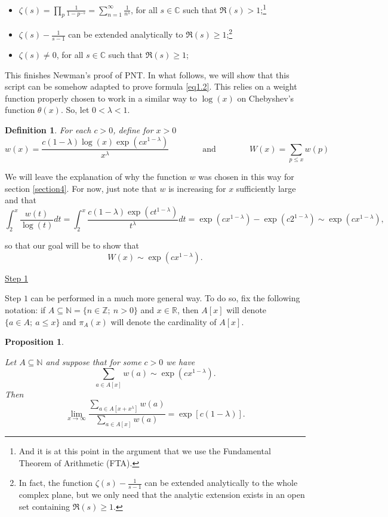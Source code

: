 \documentclass[11pt]{amsart}
\newtheorem{proposition}[theorem]{Proposition}
\newtheorem{defi}[theorem]{Definition}
\numberwithin{equation}{section}
\newcommand{\N}{\mathbb{N}}
\newcommand{\Z}{\mathbb{Z}}
\newcommand{\R}{\mathbb{R}}
\newcommand{\C}{\mathbb{C}}
\newcommand{\disum}{\displaystyle \sum}
\newcommand{\diint}{\displaystyle \int}
\newcommand{\dilim}{\displaystyle \lim}
\newcommand{\diprod}{\displaystyle \prod}
\newcommand{\difrac}{\displaystyle \frac}
\begin{document}
\begin{itemize}
    \item $\zeta(s) = \diprod_p \difrac{1}{1 - p^{-s}} = \sum_{n = 1}^{\infty} \difrac{1}{n^s}$, for all $s \in \C$ such that $\Re(s) > 1$;\footnote{And it is at this point in the argument that we use the Fundamental Theorem of Arithmetic (FTA).}
    \item $\zeta(s) - \difrac{1}{s - 1}$ can be extended analytically to $\Re(s) \geq 1$;\footnote{In fact, the function $\zeta(s) - \difrac{1}{s - 1}$ can be extended analytically to the whole complex plane, but we only need that the analytic extension exists in an open set containing $\Re(s) \geq 1$.}
    \item $\zeta(s) \neq 0$, for all $s \in \C$ such that $\Re(s) \geq 1$;
\end{itemize}

This finishes Newman's proof of PNT. In what follows, we will show that this script can be somehow adapted to prove formula \ref{eq1.2}. This relies on a weight function properly chosen to work in a similar way to $\log(x)$ on Chebyshev's function $\theta(x)$. So, let $0 < \lambda < 1$.

\begin{defi}
For each $c > 0$, define for $x > 0$ $$w(x) = \difrac{c(1 - \lambda)\log(x)\exp(cx^{1 - \lambda})}{x^{\lambda}} \qquad \qquad \text{and} \qquad \qquad W(x) = \disum_{p \leq x} w(p)$$ 
\end{defi}

We will leave the explanation of why the function $w$ was chosen in this way for section \ref{section4}. For now, just note that $w$ is increasing for $x$ sufficiently large and that $$\diint_{2}^{x} \difrac{w(t)}{\log(t)} dt = \diint_{2}^{x} \difrac{c(1 - \lambda)\exp(ct^{1 - \lambda})}{t^{\lambda}} dt = \exp(cx^{1 - \lambda}) - \exp(c2^{1 - \lambda}) \sim \exp(cx^{1 - \lambda}),$$

\noindent so that our goal will be to show that $$W(x) \sim \exp(cx^{1 - \lambda}).$$

\begin{center} \underline{Step 1} \end{center}

Step $1$ can be performed in a much more general way. To do so, fix the following notation: if $A \subseteq \N = \{n \in \Z; \ n > 0\}$ and $x \in \R$, then $A[x]$ will denote $\{a \in A; \ a \leq x\}$ and $\pi_A(x)$ will denote the cardinality of $A[x]$.

\begin{proposition} \label{initialproposition}

Let $A \subseteq \N$ and suppose that for some $c > 0$ we have $$\disum_{a \in A[x]} w(a) \sim \exp(cx^{1 - \lambda}).$$ Then $$\dilim_{x \to \infty} \difrac{\disum_{a \in A[x+x^\lambda]} w(a)}{\disum_{a \in A[x]} w(a)} = \exp[c(1 - \lambda)].$$

\end{proposition}
\end{document}
